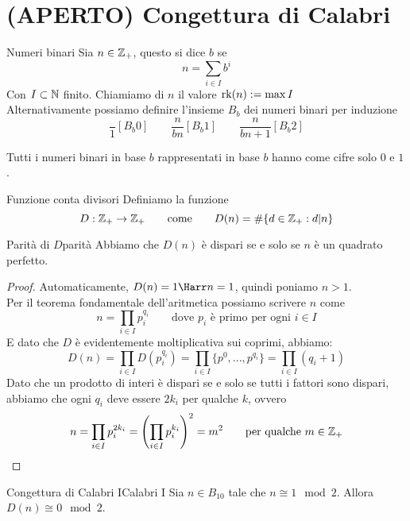 \documentclass[openany]{book}
\begin{document}
\chapter{(APERTO) Congettura di Calabri}

\begin{definition}{Numeri binari}{}
    Sia $n \in \mathbb{Z}_+$, questo si dice  $b$ se 
    \[n = \sum_{i \in I} b^i\]
    Con $I \subset \mathbb{N}$ finito. Chiamiamo  di $n$ il valore $\operatorname{rk}(n) := \max{I}$\\
    Alternativamente possiamo definire l'insieme $B_b$ dei numeri binari per induzione
    \[\frac{}{1}[B_b0] \qquad \frac{n}{b n}[B_b1] \qquad \frac{n}{b n +1}[B_b2]\]
\end{definition}
\begin{remark}{}{}
    Tutti i numeri binari in base $b$ rappresentati in base $b$ hanno come cifre solo $0$ e $1$.
\end{remark}

\begin{definition}{Funzione conta divisori}{}
    Definiamo la funzione 
    \[ D : \mathbb{Z}_+ \to \mathbb{Z}_+ \qquad \text{come} \qquad D(n) = \#\{d \in \mathbb{Z}_+ : d|n\}\]
\end{definition}
\begin{lemma}{Parità di $D$}{parità}
    Abbiamo che $D(n)$ è dispari se e solo se $n$ è un quadrato perfetto.
    \begin{proof}
        Automaticamente, $D(n) = 1 \Harr n = 1$, quindi poniamo $n > 1$.\\
        Per il teorema fondamentale dell'aritmetica possiamo scrivere $n$ come
        \[n = \prod_{i \in I}p_i^{q_i} \qquad \text{dove } p_i \text{ è primo per ogni }i \in I \]
        E dato che $D$ è evidentemente moltiplicativa sui coprimi, abbiamo:
        \[D(n) = \prod_{i \in I} D(p_i^{q_i}) = \prod_{i \in I} \{p^0,...,p^{q_i}\} = \prod_{i \in I}(q_i +1)\]
        Dato che un prodotto di interi è dispari se e solo se tutti i fattori sono dispari, abbiamo che ogni $q_i$ deve essere $2k_i$ per qualche $k$, ovvero 
        \[n = \prod_{i \in I}p_i^{2k_i} = \left(\prod_{i \in I} p_i^{k_i} \right)^2 = m^2 \qquad \text{per qualche } m \in \mathbb{Z}_+\]
    \end{proof}
\end{lemma}

\begin{theorem}{Congettura di Calabri I}{Calabri I}
    Sia $n \in B_{10}$ tale che $n \cong 1 \mod 2$. Allora $D(n) \cong 0 \mod 2$.
\end{theorem}
\end{document}
